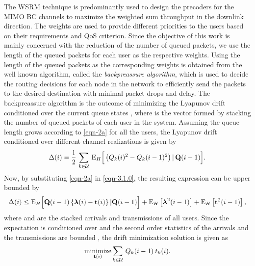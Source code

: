 
The \ac{WSRM} technique is predominantly used to design the precoders for the \ac{MIMO} \ac{BC} channels to maximize the weighted sum throughput in the downlink direction. The weights are used to provide different priorities to the users based on their requirements and \ac{QoS} criterion. Since the objective of this work is mainly concerned with the reduction of the number of queued packets, we use the length of the queued packets for each user as the respective weights. Using the length of the queued packets as the corresponding weights is obtained from the well known algorithm, called the \textit{backpreassure algorithm}, which is used to decide the routing decisions for each node in the network to efficiently send the packets to the desired destination with minimal packet drops and delay. The backpreassure algorithm is the outcome of minimizing the Lyapunov drift conditioned over the current queue states , where  is the vector formed by stacking the number of queued packets of each user in the system. Assuming the queue length grows according to \eqref{eqn-2a} for all the users, the Lyapunov drift conditioned over different channel realizations is given by \cite{georgiadis2006resource,neely2010stochastic}
\begin{equation} \label{eqn-3.1.0}
\Delta(i) = \frac{1}{2} \, \sum_{k \in \mc{U}} \, \mathrm{E}_H \Big{[}  \left ( Q_k(i)^2 - Q_k(i-1)^2 \right ) \vert \, \mbf{Q}(i - 1) \Big{]}.
\end{equation}
Now, by substituting \eqref{eqn-2a} in \eqref{eqn-3.1.0}, the resulting expression can be upper bounded by
\begin{equation}
\Delta(i)\leq \mathrm{E}_H \Big{[} \mathbf{Q}(i-1) \left \lbrace {\boldsymbol{\lambda}}(i) - \mathbf{t}(i) \right \rbrace | \mathbf{Q}(i-1) \Big{]} + \mathrm{E}_H \left [ {\boldsymbol{\lambda}}^2(i-1) \right ] + \mathrm{E}_H \left [ \mathbf{t}^2(i-1) \right ],
\end{equation}
where \me{\mbfa{\lambda}} and  are the stacked arrivals and transmissions of all users. Since the expectation is conditioned over  and the second order statistics of the arrivals and the transmissions are bounded \cite{neely2010stochastic}, the drift minimization solution is given as
\begin{equation}
\underset{\mbf{t}(i)}{\text{minimize}} \sum_{k \in \mc{U}} \, Q_k(i-1) \: t_k(i).
\label{backpreassure}
\end{equation}

